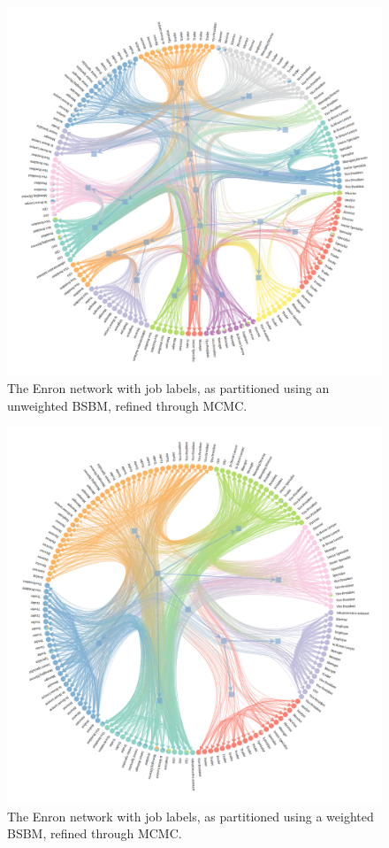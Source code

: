\documentclass[
  12pt,
  a4paper,
  DIV=11,
  numbers=noendperiod,
  twoside,
  open=any]{scrartcl}
\begin{document}
\begin{figure}

\includegraphics{figures/Browne-Crick-McLevey-2023-Figure-3.png}

\caption{\label{fig-3}The Enron network with job labels, as partitioned
using an unweighted BSBM, refined through MCMC.}

\end{figure}%

\begin{figure}

\includegraphics{figures/Browne-Crick-McLevey-2023-Figure-4.png}

\caption{\label{fig-4}The Enron network with job labels, as partitioned
using a weighted BSBM, refined through MCMC.}

\end{figure}%
\end{document}
